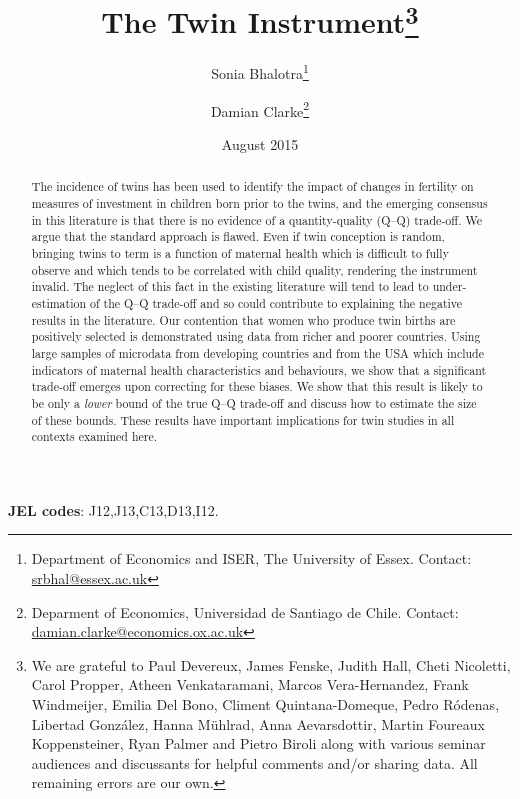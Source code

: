 \documentclass[subeqn]{article}
\title{The Twin Instrument\footnote{We are grateful to Paul Devereux, James 
Fenske, Judith Hall, Cheti Nicoletti, Carol Propper, Atheen Venkataramani, 
Marcos Vera-Hernandez, Frank Windmeijer, Emilia Del Bono, Climent 
Quintana-Domeque, Pedro R\'odenas, Libertad Gonz\'alez, Hanna M\"uhlrad, 
Anna Aevarsdottir, Martin Foureaux Koppensteiner, Ryan Palmer and Pietro 
Biroli along with various seminar audiences and discussants for helpful 
comments and/or sharing data. All remaining errors are our own.}}
\author{Sonia Bhalotra\thanks{Department of Economics and ISER, The University of
    Essex. Contact: \href{mailto:srbhal@essex.ac.uk}{srbhal@essex.ac.uk}} 
\and Damian Clarke\thanks{Deparment of Economics, Universidad de Santiago de Chile.
Contact: \href{mailto:damian.clarke@usach.cl}
{damian.clarke@economics.ox.ac.uk}}}
\date{August 2015}
\begin{document}
\begin{spacing}{1.4}

\maketitle
\vspace{-1cm}
\begin{abstract}
 The incidence of twins has been used to identify the impact of changes in 
 fertility on measures of investment in children born prior to the twins, and
 the emerging consensus in this literature is that there is no evidence of a
 quantity-quality (Q--Q) trade-off. We argue that the standard approach is 
 flawed. Even if twin conception is random, bringing twins to term is a function 
 of maternal health which is difficult to fully observe and which tends to be
 correlated with child quality, rendering the instrument invalid. The neglect
 of this fact in the existing literature will tend to lead to under-estimation 
 of the Q--Q trade-off and so could contribute to explaining the negative results
 in the literature. Our contention that women who produce twin births are
 positively selected is demonstrated using data from richer and poorer countries.
 Using large samples of microdata from developing countries and from the USA 
 which include indicators of maternal health characteristics and behaviours, we
 show that a significant trade-off emerges upon correcting for these biases. We
 show that this result is likely to be only a \emph{lower} bound of the true
 Q--Q trade-off and discuss how to estimate the size of these bounds. These
 results have important implications for twin studies in all contexts examined
 here.
\\
\end{abstract}
\hspace{4mm}\textbf{\small JEL codes}: J12,J13,C13,D13,I12. \\

\newpage

\end{spacing}
\end{document}
